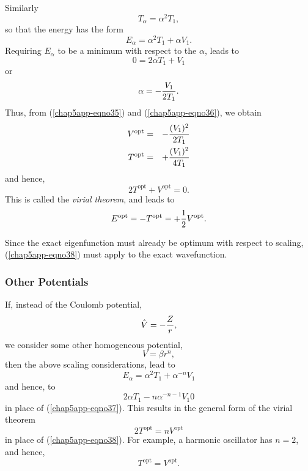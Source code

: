 Similarly
\begin{equation}
T_{\alpha} = \alpha^2 T_1 ,
\label{chap5app-eqno36}
\end{equation}
so that the energy has the form
\begin{equation}
E_{\alpha} = \alpha^2 T_1 + \alpha V_1 .
\end{equation}
Requiring $E_{\alpha}$ to be a minimum with respect to the $\alpha$, 
leads to
\begin{equation}
0 = 2 \alpha T_1 + V_1
\end{equation}
or
\begin{equation}
\alpha = - {V_1 \over 2T_1}.
\label{chap5app-eqno37}
\end{equation}
Thus, from (\ref{chap5app-eqno35}) and (\ref{chap5app-eqno36}), we obtain
\begin{eqnarray}
V^\mathrm{opt} &=& - {(V_1)^2 \over 2T_1}\cr
T^\mathrm{opt} &=& + {(V_1)^2 \over 4T_1}
\end{eqnarray}
and hence,
\begin{equation}
2T^\mathrm{opt} + V^\mathrm{opt} = 0 .
\label{chap5app-eqno38}
\end{equation}
This is called the \emph{virial theorem}, and leads to
\begin{equation}
E^\mathrm{opt} = - T^\mathrm{opt} = + {1 \over 2} V^\mathrm{opt} .
\end{equation}

Since the exact eigenfunction must already be optimum with respect to 
scaling, (\ref{chap5app-eqno38}) must apply to the exact wavefunction.

\subsubsection{Other Potentials}

If, instead of the Coulomb potential,
\begin{equation}
{\hat V} = - {Z \over r} ,
\end{equation}
we consider some other homogeneous potential,
\begin{equation}
V = \beta r^n ,
\end{equation}
then the above scaling considerations, lead to
\begin{equation}
E_{\alpha} = \alpha^2 T_1 + \alpha^{-n} V_1
\end{equation}
and hence, to
\begin{equation}
2 \alpha T_1 - n \alpha^{-n-1} V_1  0
\end{equation}
in place of (\ref{chap5app-eqno37}).  This results in the general form
of the virial theorem
\begin{equation}
2 T^\mathrm{opt} = n V^\mathrm{opt}
\end{equation}
in place of (\ref{chap5app-eqno38}).  For example, a harmonic
oscillator has $n = 2$, and hence,
\begin{equation} 
T^\mathrm{opt} = V^\mathrm{opt} .
\end{equation}
